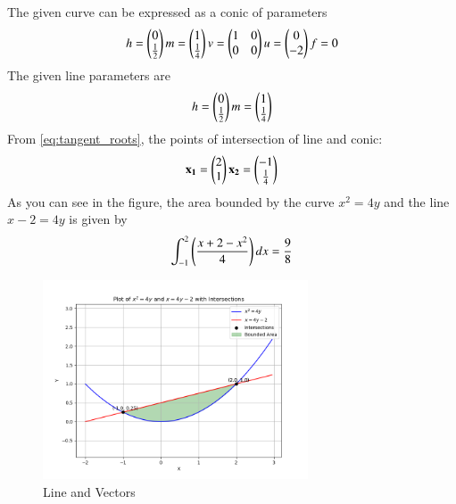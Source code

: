 \documentclass[journal]{IEEEtran}
\begin{document}
The given curve can be expressed as a conic of parameters
\begin{align}
	h=\begin{pmatrix}0\\ \frac{1}{2}\end{pmatrix} m=\begin{pmatrix}1\\\frac{1}{4}\end{pmatrix} v=\begin{pmatrix}1&0\\0&0\end{pmatrix} u=\begin{pmatrix}0\\-2\end{pmatrix} f=0 
\end{align}
The given line parameters are
\begin{align}
	h=\begin{pmatrix}0\\ \frac{1}{2}\end{pmatrix} m=\begin{pmatrix}1\\\frac{1}{4}\end{pmatrix}
\end{align}
From \eqref{eq:tangent_roots}, the points of intersection of line and conic:
\begin{align}
	\mathbf{x_1} = \begin{pmatrix}2\\1\end{pmatrix} \mathbf{x_2} = \begin{pmatrix}-1\\\frac{1}{4}\end{pmatrix}
\end{align}
As you can see in the figure, the area bounded by the curve $x^{2} = 4y$ and the line $x - 2 = 4y $  is given by
\begin{align}
	\int_{-1}^{2} \left(\frac{x + 2 - x^{2}}{4}\right)dx = \frac{9}{8} 
\end{align}
\newpage
\begin{figure}[h!]
\begin{center}
	\includegraphics[width=0.7\textwidth]{Fig/fig.png}
	\caption{Line and Vectors}
	\label{fig:4-4.2-13 - Figure -1}
\end{center}
\end{figure}
\end{document}
